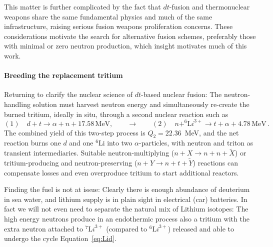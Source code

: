 \documentclass[particles,article,accept,pdftex,moreauthors]{Definitions/mdpi}
\begin{document}
This matter is further complicated by the fact that $dt$-fusion and thermonuclear weapons share the same fundamental physics and much of the same infrastructure, raising serious fusion weapons proliferation concerns. These considerations motivate the search for alternative fusion schemes, preferably those with minimal or zero neutron production, which insight motivates much of this work.

\paragraph*{\bf Breeding the replacement tritium}
Returning to clarify the nuclear science of $dt$-based nuclear fusion: The neutron-handling solution must harvest neutron energy and simultaneously re-create the burned tritium, ideally in situ, through a second nuclear reaction such as
\begin{equation}\label{eq:Lid}
(1)\quad d+t\to \alpha +n +17.58\,\mathrm{MeV}, \qquad\to \qquad (2)\quad n+^{6\!}{\mathrm Li}^{3+}\to t +\alpha + 4.78\,\mathrm{MeV}\,.
\end{equation}
The combined yield of this two-step process is $Q_2=22.36$~MeV, and the net reaction burns one $d$ and one ${}^6$Li into two $\alpha$-particles, with neutron and triton as transient intermediaries. Suitable neutron-multiplying ($n+X\to n+n+\tilde X$) or tritium-producing and neutron-preserving ($n+Y\to n+t+\tilde Y$) reactions can compensate losses and even overproduce tritium to start additional reactors. 

Finding the fuel is not at issue: Clearly there is enough abundance of deuterium in sea water, and lithium supply is in plain sight in electrical (car) batteries. In fact we will not even need to separate the natural mix of Lithium isotopes: The high energy neutrons produce in an endothermic process also a tritium with the extra neutron attached to $^{7\!}{\mathrm Li}^{3+}$ (compared to $^{6\!}{\mathrm Li}^{3+}$) released and able to undergo the cycle Equation~\eqref{eq:Lid}.
\end{document}
